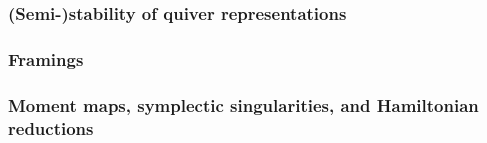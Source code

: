             \begin{example}
                
            \end{example}
            \begin{example}
                
            \end{example}
            \begin{example}
                
            \end{example}
            \begin{example}
                
            \end{example}
            \begin{example}
                
            \end{example}
            
        \subsubsection{(Semi-)stability of quiver representations}
    
        \subsubsection{Framings}
    
        \subsubsection{Moment maps, symplectic singularities, and Hamiltonian reductions}